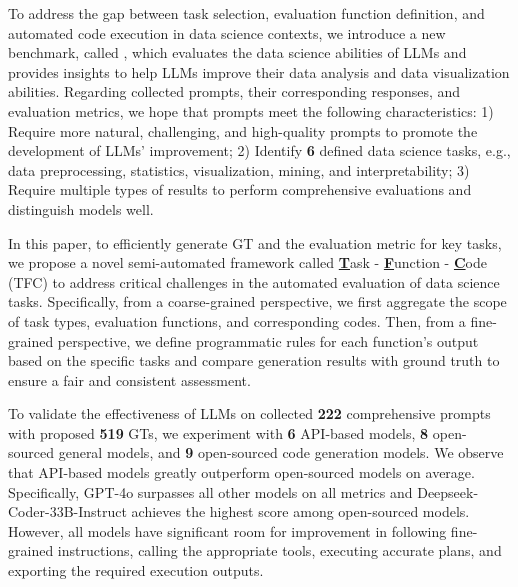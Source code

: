 To address the gap between task selection, evaluation function definition, and automated code execution in data science contexts, we introduce a new benchmark, called \benchmark, which evaluates the data science abilities of LLMs and provides insights to help LLMs improve their data analysis and data visualization abilities.
Regarding collected prompts, their corresponding responses, and evaluation metrics, we hope that prompts meet the following characteristics:
1) Require more natural, challenging, and high-quality prompts to promote the development of LLMs' improvement;
2) Identify \textbf{6} defined data science tasks, e.g., data preprocessing, statistics, visualization, mining, and interpretability;
3) Require multiple types of results to perform comprehensive evaluations and distinguish models well.


In this paper, to efficiently generate GT and the evaluation metric for key tasks, we propose a novel semi-automated framework called \underline{\textbf{T}}ask - \underline{\textbf{F}}unction - \underline{\textbf{C}}ode (TFC) to address critical challenges in the automated evaluation of data science tasks.
Specifically, from a coarse-grained perspective, we first aggregate the scope of task types, evaluation functions, and corresponding codes.
Then, from a fine-grained perspective, we define programmatic rules for each function's output based on the specific tasks and compare generation results with ground truth to ensure a fair and consistent assessment. 

To validate the effectiveness of LLMs on collected \textbf{222} comprehensive prompts with proposed \textbf{519} GTs, we experiment with \textbf{6} API-based models, \textbf{8} open-sourced general models, and \textbf{9} open-sourced code generation models.
We observe that API-based models greatly outperform open-sourced models on average.
Specifically, GPT-4o surpasses all other models on all metrics and Deepseek-Coder-33B-Instruct achieves the highest score among open-sourced models. 
However, all models have significant room for improvement in following fine-grained instructions, calling the appropriate tools, executing accurate plans, and exporting the required execution outputs.

